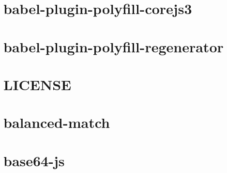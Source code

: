 \documentclass[twoside]{book}
\newcommand{\+}{\discretionary{\mbox{\scriptsize$\hookleftarrow$}}{}{}}
\begin{document}
\chapter{babel-\/plugin-\/polyfill-\/corejs3}
\label{md__c___users_vaishnavi_jadhav__desktop__developer_code_mean_stack_example_client_node_modules_bfd4064a049dd74b9321bdd9710e82d6a}

\chapter{babel-\/plugin-\/polyfill-\/regenerator}
\label{md__c___users_vaishnavi_jadhav__desktop__developer_code_mean_stack_example_client_node_modules_b4e70767f2bdffecc553db8d0d70b756d}

\chapter{LICENSE}
\label{md__c___users_vaishnavi_jadhav__desktop__developer_code_mean_stack_example_client_node_modules_balanced_match__l_i_c_e_n_s_e}

\chapter{balanced-\/match}
\label{md__c___users_vaishnavi_jadhav__desktop__developer_code_mean_stack_example_client_node_modules_balanced_match__r_e_a_d_m_e}

\chapter{base64-\/js}
\label{md__c___users_vaishnavi_jadhav__desktop__developer_code_mean_stack_example_client_node_modules_base64_js__r_e_a_d_m_e}

\end{document}
